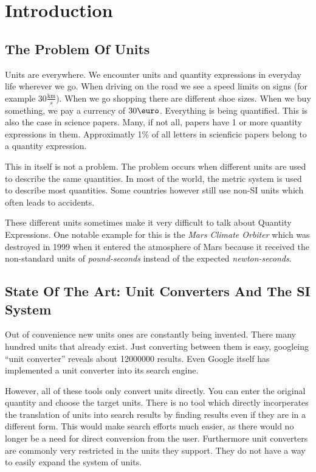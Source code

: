 \section{Introduction}

\subsection{The Problem Of Units}

Units are everywhere. We encounter units and quantity expressions in everyday life wherever we go. When driving on the road we see a speed limits on signs (for example $30 \frac{\text{km}}{s}$). When we go shopping there are different shoe sizes. When we buy something, we pay a currency of $30 \text{\euro}$. Everything is being quantified. This is also the case in science papers. Many, if not all, papers have 1 or more quantity expressions in them. Approximatly 1\% of all letters in scienficic papers belong to a quantity expression.

This in itself is not a problem. The problem occurs when different units are used to describe the same quantities. In most of the world, the metric system is used to describe most quantities. Some countries however still use non-SI units which often leads to accidents.

These different units sometimes make it very difficult to talk about Quantity Expressions. One notable example for this is the \textit{Mars Climate Orbiter} which was destroyed in 1999 when it entered the atmosphere of Mars because it received the non-standard units of \textit{pound-seconds} instead of the expected \textit{newton-seconds}\cite{nasa:mcor}.

\subsection{State Of The Art: Unit Converters And The SI System}

Out of convenience new units ones are constantly being invented. There many hundred units that already exist. Just converting between them is easy, googleing ``unit converter'' reveals about 12000000 results. Even Google itself has implemented a unit converter into its search engine.

However, all of these tools only convert units directly. You can enter the original quantity and choose the target units. There is no tool which directly incorperates the translation of units into search results by finding results even if they are in a different form. This would make search efforts much easier, as there would no longer be a need for direct conversion from the user. Furthermore unit converters are commonly very restricted in the units they support. They do not have a way to easily expand the system of units.

